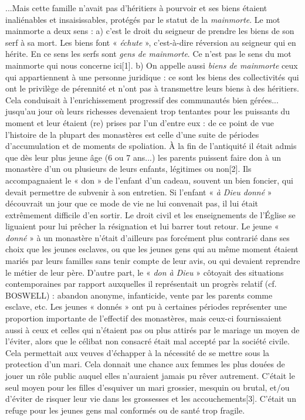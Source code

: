  ...Mais cette famille n'avait pas d'héritiers à pourvoir et ses biens étaient inaliénables et insaisissables, protégés par le statut de la \emph{mainmorte}. Le mot mainmorte a deux sens : a) c'est le droit du seigneur de prendre les biens de son serf à sa mort. Les biens font « \emph{échute} », c'est-à-dire réversion au seigneur qui en hérite. En ce sens les serfs sont\emph{ gens de mainmorte}. Ce n'est pas le sens du mot mainmorte qui nous concerne ici[1]. b) On appelle aussi \emph{biens de mainmorte} ceux qui appartiennent à une personne juridique : ce sont les biens des collectivités qui ont le privilège de pérennité et n'ont pas à transmettre leurs biens à des héritiers. Cela conduisait à l'enrichissement progressif des communautés bien gérées... jusqu'au jour où leurs richesses devenaient trop tentantes pour les puissants du moment et leur étaient (re) prises par l'un d'entre eux : de ce point de vue l'histoire de la plupart des monastères est celle d'une suite de périodes d'accumulation et de moments de spoliation.
 À la fin de l'antiquité il était admis que dès leur plus jeune âge (6 ou 7 ans...) les parents puissent faire don à un monastère d'un ou plusieurs de leurs enfants, légitimes ou non[2]. Ils accompagnaient le « don » de l'enfant d'un cadeau, souvent un bien foncier, qui devait permettre de subvenir à son entretien. Si l'enfant « \emph{à Dieu donné} » découvrait un jour que ce mode de vie ne lui convenait pas, il lui était extrêmement difficile d'en sortir. Le droit civil et les enseignements de l'Église se liguaient pour lui prêcher la résignation et lui barrer tout retour. Le jeune « \emph{donné} » à un monastère n'était d'ailleurs pas forcément plus contrarié dans ses choix que les jeunes esclaves, ou que les jeunes gens qui au même moment étaient mariés par leurs familles sans tenir compte de leur avis, ou qui devaient reprendre le métier de leur père. D'autre part, le « \emph{don à Dieu} » côtoyait des situations contemporaines par rapport auxquelles il représentait un progrès relatif (cf. BOSWELL) : abandon anonyme, infanticide, vente par les parents comme esclave, etc. 
 Les jeunes « donnés » ont pu à certaines périodes représenter une proportion importante de l'effectif des monastères, mais ceux-ci fournissaient aussi à ceux et celles qui n'étaient pas ou plus attirés par le mariage un moyen de l'éviter, alors que le célibat non consacré était mal accepté par la société civile. Cela permettait aux veuves d'échapper à la nécessité de se mettre sous la protection d'un mari. Cela donnait une chance aux femmes les plus douées de jouer un rôle public auquel elles n'auraient jamais pu rêver autrement. C'était le seul moyen pour les filles d'esquiver un mari grossier, mesquin ou brutal, et/ou d'éviter de risquer leur vie dans les grossesses et les accouchements[3]. C'était un refuge pour les jeunes gens mal conformés ou de santé trop fragile. 
